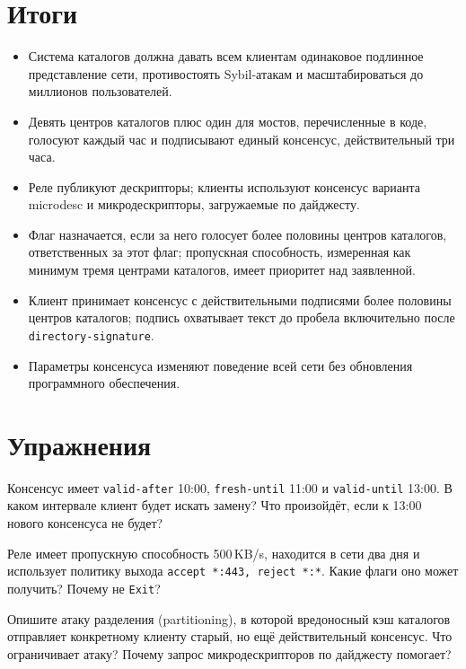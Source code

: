 \section*{Итоги}
\begin{itemize}
  \item Система каталогов должна давать всем клиентам одинаковое подлинное представление сети, противостоять Sybil-атакам и масштабироваться до миллионов пользователей.
  \item Девять центров каталогов плюс один для мостов, перечисленные в коде, голосуют каждый час и подписывают единый консенсус, действительный три часа.
  \item Реле публикуют дескрипторы; клиенты используют консенсус варианта microdesc и микродескрипторы, загружаемые по дайджесту.
  \item Флаг назначается, если за него голосует более половины центров каталогов, ответственных за этот флаг; пропускная способность, измеренная как минимум тремя центрами каталогов, имеет приоритет над заявленной.
  \item Клиент принимает консенсус с действительными подписями более половины центров каталогов; подпись охватывает текст до пробела включительно после \texttt{directory-signature}.
  \item Параметры консенсуса изменяют поведение всей сети без обновления программного обеспечения.
\end{itemize}

\section*{Упражнения}

\begin{esercizio}[1]\label{es:12-validita}
Консенсус имеет \texttt{valid-after} 10:00, \texttt{fresh-until} 11:00 и \texttt{valid-until} 13:00. В каком интервале клиент будет искать замену? Что произойдёт, если к 13:00 нового консенсуса не будет?
\end{esercizio}

\begin{esercizio}[1]\label{es:12-flag}
Реле имеет пропускную способность 500\,KB/s, находится в сети два дня и использует политику выхода \texttt{accept *:443, reject *:*}. Какие флаги оно может получить? Почему не \texttt{Exit}?
\end{esercizio}

\begin{esercizio}[2]\label{es:12-partizione}
Опишите атаку разделения (partitioning), в которой вредоносный кэш каталогов отправляет конкретному клиенту старый, но ещё действительный консенсус. Что ограничивает атаку? Почему запрос микродескрипторов по дайджесту помогает?
\end{esercizio}

